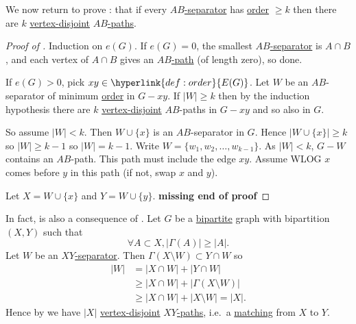 \documentclass{article}
\begin{document}
We now return to prove : that if every \hyperlink{def:abpath}{$AB$-separator} has \hyperlink{def:order}{order} $\geq k$ then there are $k$ \hyperlink{def:vertexDisjoint}{vertex-disjoint} \hyperlink{def:abpath}{$AB$-paths}.
\begin{proof}[Proof of ]
    Induction on \hyperlink{def:eG}{$e(G)$}.
    If $e(G) = 0$, the smallest \hyperlink{def:abpath}{$AB$-separator} is $A \cap B$, and each vertex of $A \cap B$ gives an \hyperlink{def:abpath}{$AB$-path} (of length zero), so done.

    If $e(G) > 0$, pick $xy \in \hyperlink{def:order}{E(G)}$.
    Let $W$ be an $AB$-separator of minimum \hyperlink{def:order}{order} in $G - xy$.
    If $|W| \geq k$ then by the induction hypothesis there are $k$ \hyperlink{def:vertexDisjoint}{vertex-disjoint} $AB$-paths in $G-xy$ and so also in $G$.

    So assume $|W| < k$. Then $W \cup \{x\}$ is an $AB$-separator in $G$.
    Hence $|W \cup \{x\}| \geq k$ so $|W| \geq k-1$ so $|W| = k-1$.
    Write $W = \{w_1, w_2, \dotsc, w_{k-1}\}$. As $|W| < k$, $G-W$ contains an $AB$-path.
    This path must include the edge $xy$.
    Assume WLOG $x$ comes before $y$ in this path (if not, swap $x$ and $y$).

    Let $X = W \cup \{x\}$ and $Y = W \cup \{y\}$.
    \textbf{missing end of proof}
\end{proof}
In fact,  is also a consequence of .
Let $G$ be a \hyperlink{def:bipartite}{bipartite} graph with bipartition $(X,Y)$ such that
\begin{equation*}
    \forall A \subset X, |\Gamma(A)| \geq |A|.
\end{equation*}
Let $W$ be an \hyperlink{def:abpath}{$XY$-separator}.
Then $\Gamma(X \setminus W) \subset Y \cap W$ so
\begin{align*}
    |W| &= |X \cap W| + |Y \cap W| \\
        &\geq |X \cap W| + |\Gamma(X \setminus W)| \\
        &\geq |X \cap W| + |X \setminus W| = |X|.
\end{align*}
Hence by  we have $|X|$ \hyperlink{def:vertexDisjoint}{vertex-disjoint} \hyperlink{def:abpath}{$XY$-paths}, i.e.\ a \hyperlink{def:matching}{matching} from $X$ to $Y$.
\end{document}
